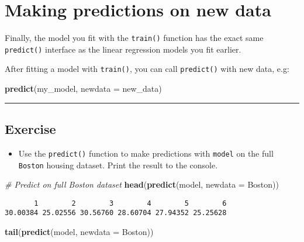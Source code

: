 \documentclass[
]{book}
\newenvironment{Shaded}{\begin{snugshade}}{\end{snugshade}}
\newcommand{\CommentTok}[1]{\textcolor[rgb]{0.56,0.35,0.01}{\textit{#1}}}
\newcommand{\DataTypeTok}[1]{\textcolor[rgb]{0.13,0.29,0.53}{#1}}
\newcommand{\KeywordTok}[1]{\textcolor[rgb]{0.13,0.29,0.53}{\textbf{#1}}}
\newcommand{\NormalTok}[1]{#1}
\providecommand{\tightlist}{%
  \setlength{\itemsep}{0pt}\setlength{\parskip}{0pt}}
\begin{document}
\hypertarget{making-predictions-on-new-data}{%
\section{Making predictions on new data}\label{making-predictions-on-new-data}}

Finally, the model you fit with the \texttt{train()} function has the exact same \texttt{predict()} interface as the linear regression models you fit earlier.

After fitting a model with \texttt{train()}, you can call \texttt{predict()} with new data, e.g:

\begin{Shaded}
\begin{Highlighting}[]
\KeywordTok{predict}\NormalTok{(my_model, }\DataTypeTok{newdata =}\NormalTok{ new_data)}
\end{Highlighting}
\end{Shaded}

\begin{center}\rule{0.5\linewidth}{0.5pt}\end{center}

\hypertarget{exercise-8}{%
\subsection*{Exercise}\label{exercise-8}}

\begin{itemize}
\tightlist
\item
  Use the \texttt{predict()} function to make predictions with \texttt{model} on the full \texttt{Boston} housing dataset. Print the result to the console.
\end{itemize}

\begin{Shaded}
\begin{Highlighting}[]
\CommentTok{# Predict on full Boston dataset}
\KeywordTok{head}\NormalTok{(}\KeywordTok{predict}\NormalTok{(model, }\DataTypeTok{newdata =}\NormalTok{ Boston))}
\end{Highlighting}
\end{Shaded}

\begin{verbatim}
       1        2        3        4        5        6 
30.00384 25.02556 30.56760 28.60704 27.94352 25.25628 
\end{verbatim}

\begin{Shaded}
\begin{Highlighting}[]
\KeywordTok{tail}\NormalTok{(}\KeywordTok{predict}\NormalTok{(model, }\DataTypeTok{newdata =}\NormalTok{ Boston))}
\end{Highlighting}
\end{Shaded}
\end{document}
